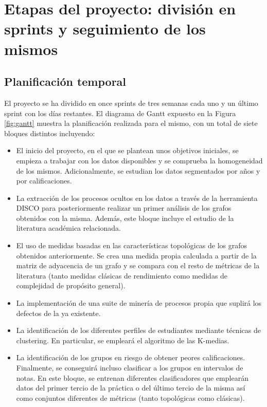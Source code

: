 \chapter{Etapas del proyecto: división en sprints y seguimiento de los mismos}\label{chapter:sprints}

\section{Planificación temporal}

El proyecto se ha dividido en once sprints de tres semanas cada uno y un último sprint con los días restantes. El diagrama de Gantt expuesto en la Figura \ref{fig:gantt} muestra la planificación realizada para el mismo, con un total de siete bloques distintos incluyendo:

\begin{itemize}
\item El inicio del proyecto, en el que se plantean unos objetivos iniciales, se empieza a trabajar con los datos disponibles y se comprueba la homogeneidad de los mismos. Adicionalmente, se estudian los datos segmentados por años y por calificaciones.
\item La extracción de los procesos ocultos en los datos a través de la herramienta DISCO para posteriormente realizar un primer análisis de los grafos obtenidos con la misma. Además, este bloque incluye el estudio de la literatura académica relacionada.
\item El uso de medidas basadas en las características topológicas de los grafos obtenidos anteriormente. Se crea una medida propia calculada a partir de la matriz de adyacencia de un grafo y se compara con el resto de métricas de la literatura (tanto medidas clásicas de rendimiento como medidas de complejidad de propósito general).
\item La implementación de una suite de minería de procesos propia que suplirá los defectos de la ya existente.
\item La identificación de los diferentes perfiles de estudiantes mediante técnicas de clustering. En particular, se empleará el algoritmo de las K-medias.
\item La identificación de los grupos en riesgo de obtener peores calificaciones. Finalmente, se conseguirá incluso clasificar a los grupos en intervalos de notas. En este bloque, se entrenan diferentes clasificadores que emplearán datos del primer tercio de la práctica o del último tercio de la misma así como conjuntos diferentes de métricas (tanto topológicas como clásicas).
\end{itemize}


